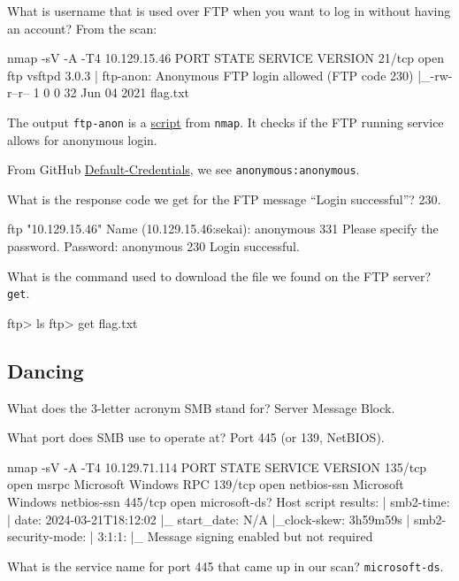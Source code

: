 \documentclass[a4paper,12pt]{article}
\newcommand{\bashinline}[1]{\texttt{#1}}
\begin{document}
What is username that is used over FTP when you want to log in without having an account? From the scan:
\begin{bash}
nmap -sV -A -T4 10.129.15.46
PORT   STATE SERVICE VERSION
21/tcp open  ftp     vsftpd 3.0.3
| ftp-anon: Anonymous FTP login allowed (FTP code 230)
|_-rw-r--r--    1 0        0              32 Jun 04  2021 flag.txt
\end{bash}

The output \bashinline{ftp-anon} is a \href{https://nmap.org/nsedoc/scripts/ftp-anon.html}{script} from \bashinline{nmap}. It checks if the FTP running service allows for anonymous login.

From GitHub \href{https://github.com/danielmiessler/SecLists/blob/master/Passwords/Default-Credentials/ftp-betterdefaultpasslist.txt}{Default-Credentials}, we see \bashinline{anonymous:anonymous}.

What is the response code we get for the FTP message ``Login successful''? 230.
\begin{bash}
ftp "10.129.15.46"
Name (10.129.15.46:sekai): anonymous
331 Please specify the password.
Password: anonymous
230 Login successful.
\end{bash}

What is the command used to download the file we found on the FTP server? \bashinline{get}.
\begin{bash}
ftp> ls
ftp> get flag.txt
\end{bash}

\subsection{Dancing \faWindows}

What does the 3-letter acronym SMB stand for? Server Message Block.

What port does SMB use to operate at? Port 445 (or 139, NetBIOS).
\begin{bash}
nmap -sV -A -T4 10.129.71.114
PORT    STATE SERVICE       VERSION
135/tcp open  msrpc         Microsoft Windows RPC
139/tcp open  netbios-ssn   Microsoft Windows netbios-ssn
445/tcp open  microsoft-ds?
Host script results:
| smb2-time:
|   date: 2024-03-21T18:12:02
|_  start_date: N/A
|_clock-skew: 3h59m59s
| smb2-security-mode:
|   3:1:1:
|_    Message signing enabled but not required
\end{bash}

What is the service name for port 445 that came up in our scan? \bashinline{microsoft-ds}.
\end{document}

